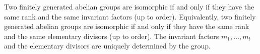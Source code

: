 Two finitely generated abelian groups are isomorphic if and only if they have the same rank and the same invariant factors (up to order). Equivalently, two finitely generated abelian groups are isomorphic if and only if they have the same rank and the same elementary divisors (up to order). The invariant factors $m_1, \ldots, m_t$ and the elementary divisors are uniquely determined by the group.
